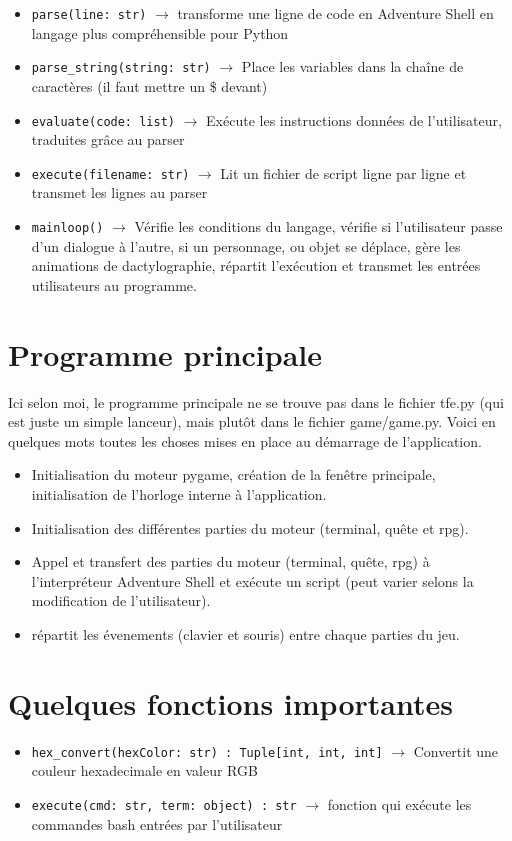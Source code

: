 \documentclass{report}
\begin{document}
\begin{itemize}
  \item \texttt{parse(line: str)} $\rightarrow$ transforme une ligne de code en Adventure Shell en langage plus compréhensible pour Python
  \item \texttt{parse_string(string: str)} $\rightarrow$ Place les variables dans la chaîne de caractères (il faut mettre un \$ devant)
  \item \texttt{evaluate(code: list)} $\rightarrow$ Exécute les instructions données de l'utilisateur, traduites grâce au parser
  \item \texttt{execute(filename: str)} $\rightarrow$ Lit un fichier de script ligne par ligne et transmet les lignes au parser
  \item \texttt{mainloop()} $\rightarrow$ Vérifie les conditions du langage, vérifie si l'utilisateur passe d'un dialogue à l'autre, si un personnage, ou objet se déplace, gère les animations de dactylographie, répartit l'exécution et transmet les entrées utilisateurs au programme.
\end{itemize}

\newpage \section{Programme principale}
Ici selon moi, le programme principale ne se trouve pas dans le fichier tfe.py (qui est juste un simple lanceur), mais plutôt dans le fichier game/game.py. Voici en quelques mots toutes les choses mises en place au démarrage de l'application.

\begin{itemize}
  \item Initialisation du moteur pygame, création de la fenêtre principale, initialisation de l'horloge interne à l'application.
  \item Initialisation des différentes parties du moteur (terminal, quête et rpg).
  \item Appel et transfert des parties du moteur (terminal, quête, rpg) à l'interpréteur Adventure Shell et exécute un script (peut varier selons la modification de l'utilisateur).
  \item répartit les évenements (clavier et souris) entre chaque parties du jeu.
\end{itemize}

\section{Quelques fonctions importantes}
\begin{itemize}
    \item \texttt{hex_convert(hexColor: str) : Tuple[int, int, int]} $\rightarrow$ Convertit une couleur hexadecimale en valeur RGB
    \item \texttt{execute(cmd: str, term: object) : str} $\rightarrow$ fonction qui exécute les commandes bash entrées par l'utilisateur

\end{itemize}
\end{document}
